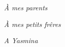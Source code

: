 \newpage
\cleardoublepage

\vspace*{\fill}
\hfill\textit{À mes parents}

\hfill\textit{À mes petits frêres}

\hfill\textit{A Yasmina}
\verb| |\\
\verb| |\\
\verb| |\\
\verb| |\\
\verb| |\\
\verb| |\\
\verb| |\\
\verb| |\\
\verb| |\\
\verb| |\\
\verb| |\\
\verb| |\\
\verb| |\\
\verb| |\\
\verb| |\\
\verb| |\\
\verb| |\\
\vspace*{\fill}

